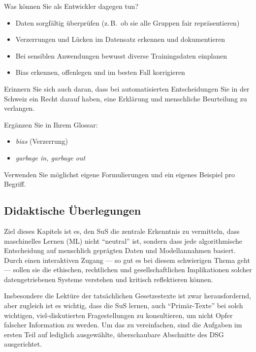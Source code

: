 \begin{lpu}
Was können Sie als Entwickler dagegen tun?

\begin{itemize}
  \item Daten sorgfältig überprüfen (z.\,B.\ ob sie alle Gruppen fair repräsentieren)
  \item Verzerrungen und Lücken im Datensatz erkennen und dokumentieren
  \item Bei sensiblen Anwendungen bewusst diverse Trainingsdaten einplanen
  \item Bias erkennen, offenlegen und im besten Fall korrigieren
\end{itemize}

Erinnern Sie sich auch daran, dass bei automatisierten Entscheidungen Sie in der Schweiz ein Recht darauf haben, eine Erklärung und menschliche Beurteilung zu verlangen.

\begin{aufgabe}{7}
Ergänzen Sie in Ihrem Glossar:

\begin{itemize}
  \item \textit{bias} (Verzerrung)
  \item \textit{garbage in, garbage out}
\end{itemize}
Verwenden Sie möglichst eigene Formulierungen und ein eigenes Beispiel pro Begriff.
\end{aufgabe}

\end{lpu}

\subsection*{Didaktische Überlegungen}

Ziel dieses Kapitels ist es, den SuS die zentrale Erkenntnis zu vermitteln, dass maschinelles Lernen (ML) nicht ``neutral'' ist, sondern dass jede algorithmische Entscheidung auf menschlich geprägten Daten und Modellannahmen basiert. Durch einen interaktiven Zugang — so gut es bei diesem schwierigen Thema geht — sollen sie die ethischen, rechtlichen und gesellschaftlichen Implikationen solcher datengetriebenen Systeme verstehen und kritisch reflektieren können. 

Insbesondere die Lektüre der tatsächlichen Gesetzestexte ist zwar herausfordernd, aber zugleich ist es wichtig, dass die SuS lernen, auch ``Primär-Texte'' bei solch wichtigen, viel-diskutierten Fragestellungen zu konsultieren, um nicht Opfer falscher Information zu werden. Um das zu vereinfachen, sind die Aufgaben im ersten Teil auf lediglich ausgewählte, überschaubare Abschnitte des DSG ausgerichtet.

